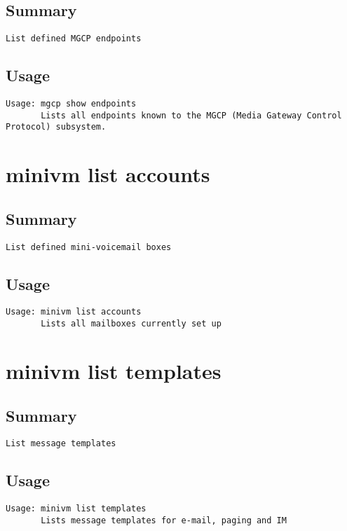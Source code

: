 \subsection{Summary}
\begin{verbatim}
List defined MGCP endpoints
\end{verbatim}
\subsection{Usage}
\begin{verbatim}
Usage: mgcp show endpoints
       Lists all endpoints known to the MGCP (Media Gateway Control Protocol) subsystem.

\end{verbatim}


\section{minivm list accounts}
\subsection{Summary}
\begin{verbatim}
List defined mini-voicemail boxes
\end{verbatim}
\subsection{Usage}
\begin{verbatim}
Usage: minivm list accounts
       Lists all mailboxes currently set up

\end{verbatim}


\section{minivm list templates}
\subsection{Summary}
\begin{verbatim}
List message templates
\end{verbatim}
\subsection{Usage}
\begin{verbatim}
Usage: minivm list templates
       Lists message templates for e-mail, paging and IM

\end{verbatim}


